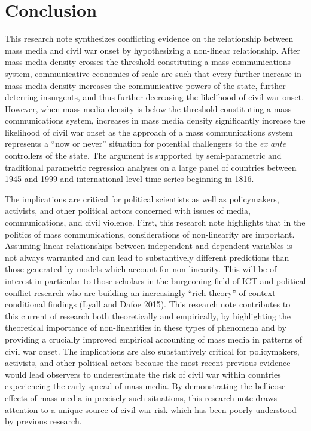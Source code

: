 \documentclass[11pt,article,oneside]{memoir}
\begin{document}
\section{Conclusion}\label{conclusion}

This research note synthesizes conflicting evidence on the relationship
between mass media and civil war onset by hypothesizing a non-linear
relationship. After mass media density crosses the threshold
constituting a mass communications system, communicative economies of
scale are such that every further increase in mass media density
increases the communicative powers of the state, further deterring
insurgents, and thus further decreasing the likelihood of civil war
onset. However, when mass media density is below the threshold
constituting a mass communications system, increases in mass media
density significantly increase the likelihood of civil war onset as the
approach of a mass communications system represents a ``now or never''
situation for potential challengers to the \emph{ex ante} controllers of
the state. The argument is supported by semi-parametric and traditional
parametric regression analyses on a large panel of countries between
1945 and 1999 and international-level time-series beginning in 1816.

The implications are critical for political scientists as well as
policymakers, activists, and other political actors concerned with
issues of media, communications, and civil violence. First, this
research note highlights that in the politics of mass communications,
considerations of non-linearity are important. Assuming linear
relationships between independent and dependent variables is not always
warranted and can lead to substantively different predictions than those
generated by models which account for non-linearity. This will be of
interest in particular to those scholars in the burgeoning field of ICT
and political conflict research who are building an increasingly ``rich
theory'' of context-conditional findings (Lyall and Dafoe 2015). This
research note contributes to this current of research both theoretically
and empirically, by highlighting the theoretical importance of
non-linearities in these types of phenomena and by providing a crucially
improved empirical accounting of mass media in patterns of civil war
onset. The implications are also substantively critical for
policymakers, activists, and other political actors because the most
recent previous evidence would lead observers to underestimate the risk
of civil war within countries experiencing the early spread of mass
media. By demonstrating the bellicose effects of mass media in precisely
such situations, this research note draws attention to a unique source
of civil war risk which has been poorly understood by previous research.
\end{document}
